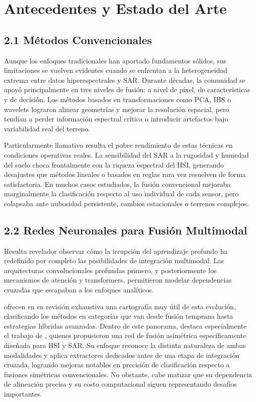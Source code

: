 \section{Antecedentes y Estado del Arte}

\subsection{2.1 Métodos Convencionales}

Aunque los enfoques tradicionales han aportado fundamentos sólidos, sus limitaciones se vuelven evidentes cuando se enfrentan a la heterogeneidad extrema entre datos hiperespectrales y SAR. Durante décadas, la comunidad se apoyó principalmente en tres niveles de fusión: a nivel de píxel, de características y de decisión. Los métodos basados en transformaciones como PCA, IHS o wavelets lograron alinear geometrías y mejorar la resolución espacial, pero tendían a perder información espectral crítica o introducir artefactos bajo variabilidad real del terreno.

Particularmente llamativo resulta el pobre rendimiento de estas técnicas en condiciones operativas reales. La sensibilidad del SAR a la rugosidad y humedad del suelo choca frontalmente con la riqueza espectral del HSI, generando desajustes que métodos lineales o basados en reglas rara vez resuelven de forma satisfactoria. En muchos casos estudiados, la fusión convencional mejoraba marginalmente la clasificación respecto al uso individual de cada sensor, pero colapsaba ante nubosidad persistente, cambios estacionales o terrenos complejos.

\subsection{2.2 Redes Neuronales para Fusión Multimodal}

Resulta revelador observar cómo la irrupción del aprendizaje profundo ha redefinido por completo las posibilidades de integración multimodal. Las arquitecturas convolucionales profundas primero, y posteriormente los mecanismos de atención y transformers, permitieron modelar dependencias cruzadas que escapaban a los enfoques analíticos. 

\cite{Li2022Deep} ofrecen en su revisión exhaustiva una cartografía muy útil de esta evolución, clasificando los métodos en categorías que van desde fusión temprana hasta estrategias híbridas avanzadas. Dentro de este panorama, destaca especialmente el trabajo de \cite{Li2023Asymmetric}, quienes propusieron una red de fusión asimétrica específicamente diseñada para HSI y SAR. Su enfoque reconoce la distinta naturaleza de ambas modalidades y aplica extractores dedicados antes de una etapa de integración cruzada, logrando mejoras notables en precisión de clasificación respecto a fusiones simétricas convencionales. No obstante, cabe matizar que su dependencia de alineación precisa y su costo computacional siguen representando desafíos importantes.

